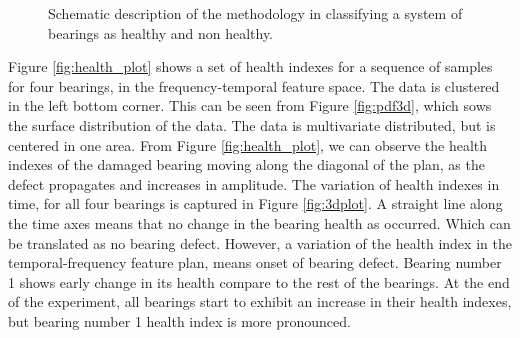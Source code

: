 \documentclass[../Main/thesis.tex]{subfiles}
\begin{document}
\begin{figure}[H]
	\caption{Schematic description of the methodology in classifying a system of bearings as healthy and non healthy.}
	\label{fig:method2}
\end{figure}
\justify
Figure \ref{fig:health_plot} shows a set of health indexes for a sequence of samples for four bearings, in the frequency-temporal feature space. The data is clustered in the left bottom corner. This can be seen from Figure \ref{fig:pdf3d}, which sows the surface distribution of the data. The data is multivariate distributed, but is centered in one area. From Figure \ref{fig:health_plot}, we can observe the health indexes of the damaged bearing moving along the diagonal of the plan, as the defect propagates and increases in amplitude.
\justify
The variation of health indexes in time, for all four bearings is captured in Figure \ref{fig:3dplot}. A straight line along the time axes means that no change in the bearing health as occurred. Which can be translated as no bearing defect. However, a variation of the health index in the temporal-frequency feature plan, means onset of bearing defect.
Bearing number 1 shows early change in its health compare to the rest of the bearings.
At the end of the experiment, all bearings start to exhibit an increase in their health indexes, but bearing number 1 health index is more pronounced.
\end{document}
